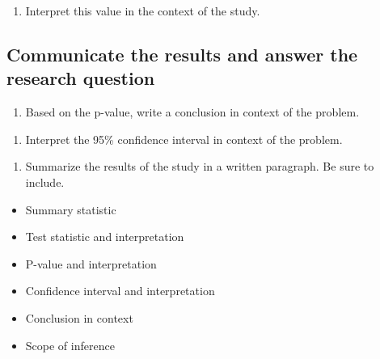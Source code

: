 \documentclass[
]{report}
\providecommand{\tightlist}{%
  \setlength{\itemsep}{0pt}\setlength{\parskip}{0pt}}
\begin{document}
\vspace{1in}

\begin{enumerate}
\def\labelenumi{\arabic{enumi}.}
\setcounter{enumi}{18}
\tightlist
\item
  Interpret this value in the context of the study.
\end{enumerate}

\vspace{1in}

\hypertarget{communicate-the-results-and-answer-the-research-question}{%
\subsection{Communicate the results and answer the research question}\label{communicate-the-results-and-answer-the-research-question}}

\begin{enumerate}
\def\labelenumi{\arabic{enumi}.}
\setcounter{enumi}{19}
\tightlist
\item
  Based on the p-value, write a conclusion in context of the problem.
\end{enumerate}

\vspace{1in}

\begin{enumerate}
\def\labelenumi{\arabic{enumi}.}
\setcounter{enumi}{20}
\tightlist
\item
  Interpret the 95\% confidence interval in context of the problem.
\end{enumerate}

\vspace{1in}

\begin{enumerate}
\def\labelenumi{\arabic{enumi}.}
\setcounter{enumi}{21}
\tightlist
\item
  Summarize the results of the study in a written paragraph. Be sure to include.
\end{enumerate}

\begin{itemize}
\item
  Summary statistic
\item
  Test statistic and interpretation
\item
  P-value and interpretation
\item
  Confidence interval and interpretation
\item
  Conclusion in context
\item
  Scope of inference
\end{itemize}
\end{document}
